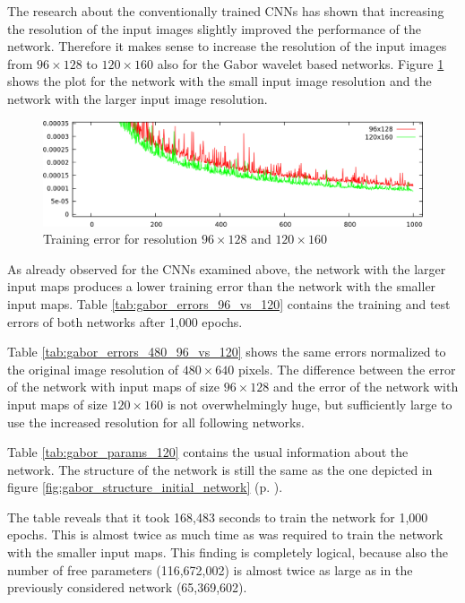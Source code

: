 \documentclass[11pt, a4paper]{article}
\newcommand\myref[1]{\ref{#1} (p. \pageref{#1})}
\begin{document}
The research about the conventionally trained \acp{CNN} has shown that increasing the resolution of the input images slightly improved the performance of the network. Therefore it makes sense to increase the resolution of the input images from $96\times128$ to $120\times160$ also for the Gabor wavelet based networks. Figure \ref{fig:gabor_absatan2_96_vs_120} shows the plot for the network with the small input image resolution and the network with the larger input image resolution.

\begin{figure}[h!]
	\centering
	\includegraphics[width=\textwidth]{images/results/gabor_absatan2_96_vs_120.png}
	\caption{Training error for resolution $96\times128$ and $120\times160$}
	\label{fig:gabor_absatan2_96_vs_120}
\end{figure}

As already observed for the \acp{CNN} examined above, the network with the larger input maps produces a lower training error than the network with the smaller input maps. Table \ref{tab:gabor_errors_96_vs_120} contains the training and test errors of both networks after 1,000 epochs.



Table \ref{tab:gabor_errors_480_96_vs_120} shows the same errors normalized to the original image resolution of $480\times640$ pixels. The difference between the error of the network with input maps of size $96\times128$ and the error of the network with input maps of size $120\times160$ is not overwhelmingly huge, but sufficiently large to use the increased resolution for all following networks.



Table \ref{tab:gabor_params_120} contains the usual information about the network. The structure of the network is still the same as the one depicted in figure \myref{fig:gabor_structure_initial_network}.



The table reveals that it took 168,483 seconds to train the network for 1,000 epochs. This is almost twice as much time as was required to train the network with the smaller input maps. This finding is completely logical, because also the number of free parameters (116,672,002) is almost twice as large as in the previously considered network (65,369,602).
\end{document}
